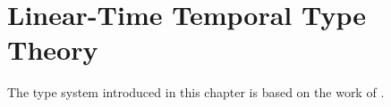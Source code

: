 \chapter{Linear-Time Temporal Type Theory}\label{chapter:the-type-system}

The type system introduced in this chapter is based on the work of \cite{Paykin2016TheEO}.


